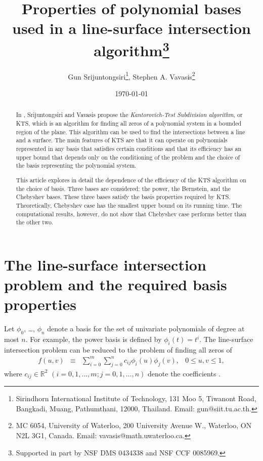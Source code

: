 \documentclass[12pt]{article}
\author{Gun Srijuntongsiri\thanks{Sirindhorn International Institute of Technology, 131 Moo 5, Tiwanont Road,
Bangkadi, Muang, Pathumthani, 12000, Thailand. Email:
gun@siit.tu.ac.th.},
Stephen A. Vavasis\thanks{MC 6054, University of Waterloo, 200
University Avenue W., Waterloo, ON N2L 3G1, Canada. Email:
vavasis@math.uwaterloo.ca.}}
\title{Properties of polynomial bases used in a line-surface intersection algorithm\thanks{Supported in part by NSF DMS 0434338 and NSF CCF 0085969.}}
\date{\today}
\begin{document}
\maketitle
\newcommand{\cond}[1]{\mathop{\rm{cond}}(#1)}
\newcommand{\norm}[1]{\left\|#1\right\|}
\newcommand{\normtwo}[1]{\left\|#1\right\|_2}
\newcommand{\abs}[1]{\left|#1\right|} \newcommand{\norma}[1]{\left\|#1\right\|}   \newcommand{\inv}[1]{#1^{-1}}
\newcommand{\nchoosek}[2]{\left(\begin{array}{c} #1\\ #2 \end{array} \right)}

\newtheorem{thm}{Theorem}[section]
\newtheorem{cor}[thm]{Corollary}
\newtheorem{lemma}[thm]{Lemma}
\newtheorem{prop}{Proposition}[thm]

\theoremstyle{remark}
\newtheorem{rem}[thm]{Remark}

\begin{abstract}
In \cite{srijuntongsiri_lsi}, Srijuntongsiri and Vavasis propose
the \emph{Kantorovich-Test Subdivision algorithm}, or KTS, which is
an algorithm for finding all zeros of a polynomial system in a bounded region
of the plane.  This algorithm can be used to find the intersections between a
line and a surface.  The main features of KTS are that it can operate on
polynomials represented in any basis that satisfies certain
conditions and that its efficiency has an upper bound
that depends only on the conditioning of the problem and the choice of
the basis representing the polynomial system.

This article explores in detail the dependence of the efficiency of the KTS algorithm on the choice of basis.
Three bases are considered: the power, the Bernstein, and the Chebyshev bases.
These three bases satisfy the basis properties required by KTS.
Theoretically, Chebyshev case has the smallest upper bound on its running time.
The computational results, however, do not show that Chebyshev case performs
better than the other two.
\end{abstract}

\section{The line-surface intersection problem and the required basis properties}
\label{section_basis_prop}

Let $\phi_0$, \ldots, $\phi_n$ denote a basis for the set of
univariate polynomials of degree at most $n$.  For example,
the power basis is defined by $\phi_i(t)=t^i$.  The line-surface
intersection problem can be reduced to the problem
of finding all zeros of
\begin{equation}
\label{maineq}
\begin{array}{llll}
f(u,v) & \equiv & \displaystyle\sum_{i=0}^m \sum_{j=0}^n c_{ij}
\phi_i(u)\phi_j(v), & 0 \leq u,v \leq 1,
\end{array}
\end{equation}
where $c_{ij} \in \mathbb{R}^2$ $(i=0,1,\ldots,m;
j=0,1,\ldots,n)$ denote the coefficients \cite{srijuntongsiri_lsi}.
\end{document}
